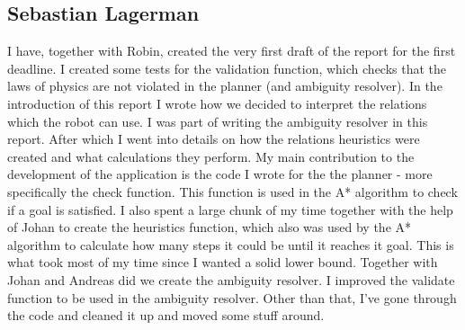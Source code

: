 \subsection*{Sebastian Lagerman}
I have, together with Robin, created the very first draft of the report for the first deadline.
\newline
\newline
I created some tests for the validation function, which checks that the laws of physics are not violated in the planner (and ambiguity resolver).
\newline
\newline
In the introduction of this report I wrote how we decided to interpret the relations which the robot can use.
I was part of writing the ambiguity resolver in this report.
After which I went into details on how the relations heuristics were created and what calculations they perform.
\newline
\newline
My main contribution to the development of the application is the code I wrote for the the planner - more specifically the check function.
This function is used in the A* algorithm to check if a goal is satisfied.
I also spent a large chunk of my time together with the help of Johan to create the heuristics function, which also was used by the A* algorithm to calculate how many steps it could be until it reaches it goal.
This is what took most of my time since I wanted a solid lower bound.
Together with Johan and Andreas did we create the ambiguity resolver.
I improved the validate function to be used in the ambiguity resolver.
Other than that, I've gone through the code and cleaned it up and moved some stuff around.

